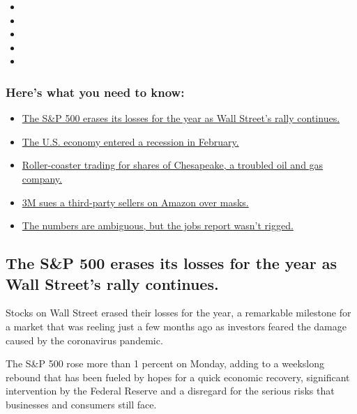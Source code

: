 \begin{itemize}
\item
\item
\item
\item
\item
\end{itemize}

\hypertarget{heres-what-you-need-to-know}{%
\subsubsection{Here's what you need to
know:}\label{heres-what-you-need-to-know}}

\begin{itemize}
\tightlist
\item
  \protect\hyperlink{link-7bd27140}{The S\&P 500 erases its losses for
  the year as Wall Street's rally continues.}
\item
  \protect\hyperlink{link-2fe46873}{The U.S. economy entered a recession
  in February.}
\item
  \protect\hyperlink{link-75b50c7b}{Roller-coaster trading for shares of
  Chesapeake, a troubled oil and gas company.}
\item
  \protect\hyperlink{link-726b3581}{3M sues a third-party sellers on
  Amazon over masks.}
\item
  \protect\hyperlink{link-2b1e48ba}{The numbers are ambiguous, but the
  jobs report wasn't rigged.}
\end{itemize}

\hypertarget{the-sp-500-erases-its-losses-for-the-year-as-wall-streets-rally-continues}{%
\subsection{The S\&P 500 erases its losses for the year as Wall Street's
rally
continues.}\label{the-sp-500-erases-its-losses-for-the-year-as-wall-streets-rally-continues}}

Stocks on Wall Street erased their losses for the year, a remarkable
milestone for a market that was reeling just a few months ago as
investors feared the damage caused by the coronavirus pandemic.

The S\&P 500 rose more than 1 percent on Monday, adding to a weekslong
rebound that has been fueled by hopes for a quick economic recovery,
significant intervention by the Federal Reserve and a disregard for the
serious risks that businesses and consumers still face.

